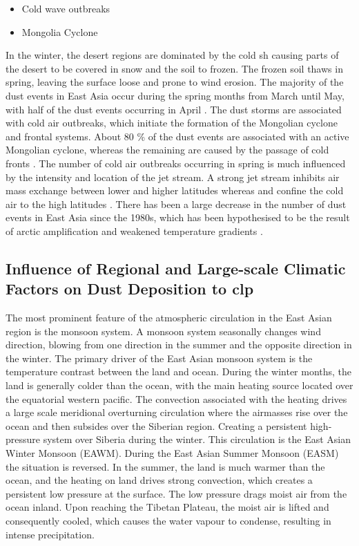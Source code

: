\begin{itemize}

    \item Cold wave outbreaks
    \item Mongolia Cyclone
\end{itemize}
In the winter, the desert regions are dominated by the cold \acrshort{sh} causing parts of the desert to be covered in snow and the soil to frozen. The frozen soil thaws in spring, leaving the surface loose and prone to wind erosion. 
The majority of the dust events in East Asia occur during the spring months from March until May, with half of the dust events occurring in April \parencite{sun2001spatial}. The dust storms are associated with cold air outbreaks, which initiate the formation of the Mongolian cyclone and frontal systems. About 80 \% of the dust events are associated with an active Mongolian cyclone, whereas the remaining are caused by the passage of cold fronts \parencite{sun2001spatial}.
The number of cold air outbreaks occurring in spring is much influenced by the intensity and location of the jet stream. A strong jet stream inhibits air mass exchange between lower and higher latitudes whereas and confine the cold air to the high latitudes \parencite{wang2008variability}. There has been a large decrease in the number of dust events in East Asia since the 1980s, which has been hypothesised to be the result of arctic amplification and weakened temperature gradients \parencite{liu2020impact}. 

\subsection{Influence of Regional and Large-scale Climatic Factors on Dust Deposition to \acrshort{clp}}
The most prominent feature of the atmospheric circulation in the East Asian region is the monsoon system. A monsoon system seasonally changes wind direction, blowing from one direction in the summer and the opposite direction in the winter. The primary driver of the East Asian monsoon system is the temperature contrast between the land and ocean. During the winter months, the land is generally colder than the ocean, with the main heating source located over the equatorial western pacific. The convection associated with the heating drives a large scale meridional overturning circulation where the airmasses rise over the ocean and then subsides over the Siberian region. Creating a persistent high-pressure system over Siberia during the winter. This circulation is the East Asian Winter Monsoon (EAWM). During the East Asian Summer Monsoon (EASM) the situation is reversed. In the summer, the land is much warmer than the ocean, and the heating on land drives strong convection, which creates a persistent low pressure at the surface. The low pressure drags moist air from the ocean inland. Upon reaching the Tibetan Plateau, the moist air is lifted and consequently cooled, which causes the water vapour to condense, resulting in intense precipitation. 

